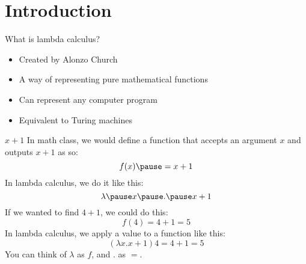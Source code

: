 \section{Introduction}
\begin{namedframe}{What is lambda calculus?}
	\begin{itemize}[<+->]
		\item Created by Alonzo Church
		\item A way of representing \alert{pure} mathematical functions
		\item Can represent any computer program
		\item Equivalent to Turing machines
	\end{itemize}
\end{namedframe}
\begin{namedframe}{$x+1$}
	In math class, we would define a function that accepts an argument $x$ and outputs $x+1$ as so:
	\[f(x) \pause = x + 1\]
	\pause
	In lambda calculus, we do it like this:
	\[\lambda \pause x \pause . \pause x + 1\]
	\pause
	If we wanted to find $4 + 1$, we could do this:
	\[f(4) = 4 + 1 = 5\]
	\pause
	In lambda calculus, we \alert{apply} a value to a function like this:
	\[(\lambda x . x + 1) 4 = 4 + 1 = 5\]
	\pause
	You can think of $\lambda$ as $f$, and $.$ as $=$.
\end{namedframe}
